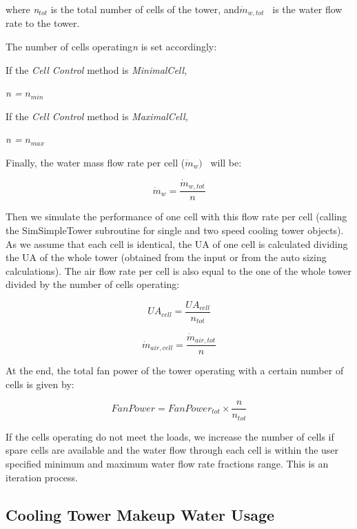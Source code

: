where \emph{n\(_{tot}\)} is the total number of cells of the tower, and\({{{\dot m}_{w,tot}}}\) ~is the water flow rate to the tower.

The number of cells operating\emph{n} is set accordingly:

If the \emph{Cell Control} method is \emph{MinimalCell,}

\emph{n =} \({{n_{min}}}\)

If the \emph{Cell Control} method is \emph{MaximalCell,}

\emph{n =} \({{n_{max}}}\)

Finally, the water mass flow rate per cell (\({{\dot m}_w})\) ~will be:

\begin{equation}
{{\dot m}_w} = \frac{{{{\dot m}_{w,tot}}}}{n}
\end{equation}

Then we simulate the performance of one cell with this flow rate per cell (calling the SimSimpleTower subroutine for single and two speed cooling tower objects). As we assume that each cell is identical, the UA of one cell is calculated dividing the UA of the whole tower (obtained from the input or from the auto sizing calculations). The air flow rate per cell is also equal to the one of the whole tower divided by the number of cells operating:

\begin{equation}
U{A_{cell}} = \frac{{U{A_{cell}}}}{{{n_{tot}}}}
\end{equation}

\begin{equation}
{\dot m_{air,cell}} = \frac{{{{\dot m}_{air,tot}}}}{n}
\end{equation}

At the end, the total fan power of the tower operating with a certain number of cells is given by:

\begin{equation}
FanPower = FanPowe{r_{tot}} \times \frac{n}{{{n_{tot}}}}
\end{equation}

If the cells operating do not meet the loads, we increase the number of cells if spare cells are available and the water flow through each cell is within the user specified minimum and maximum water flow rate fractions range. This is an iteration process.

\subsection{Cooling Tower Makeup Water Usage}\label{cooling-tower-makeup-water-usage-1}

